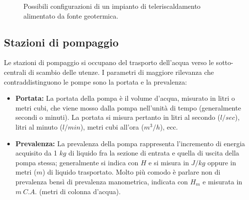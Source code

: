 \documentclass[laurea,oneside,11pt]{USiena_tesiLM}
\begin{document}
 \begin{figure}[!ht]
 \centering
 \hspace{5mm}
 \caption{Possibili configurazioni di un impianto di teleriscaldamento alimentato da fonte geotermica.}
 \end{figure}

\subsection{Stazioni di pompaggio}
Le stazioni di pompaggio si occupano del trasporto dell'acqua verso le sotto-centrali di scambio delle utenze.
I parametri di maggiore rilevanza che contraddistinguono le pompe sono la portata e la prevalenza:
\begin{itemize}
\item \textbf{Portata:} La portata della pompa è il volume d'acqua, misurato in litri o metri cubi, che viene mosso dalla pompa nell'unità di tempo (generalmente secondi o minuti). La portata si misura pertanto in litri al secondo ($l/sec$), litri al minuto ($l/min$), metri cubi all'ora ($m^3/h$), ecc.
\item \textbf{Prevalenza:} La prevalenza della pompa rappresenta l'incremento di energia acquisito da 1 $kg$ di liquido fra la sezione di entrata e quella di uscita della pompa stessa; generalmente si indica con $H$ e si misura in $J/kg$ oppure in metri ($m$) di liquido trasportato. Molto più comodo è parlare non di prevalenza bensì di prevalenza manometrica, indicata con $H_m$ e misurata in $m \ C.A.$ (metri di colonna d'acqua).
\end{itemize}
\end{document}
